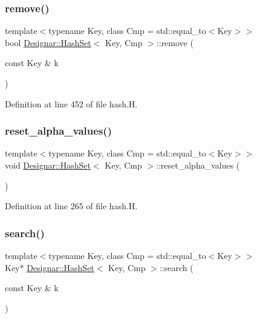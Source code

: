 \subsubsection{\texorpdfstring{remove()}{remove()}}
{\footnotesize\ttfamily template$<$typename Key, class Cmp = std\+::equal\+\_\+to$<$\+Key$>$$>$ \\
bool \hyperlink{class_designar_1_1_hash_set}{Designar\+::\+Hash\+Set}$<$ Key, Cmp $>$\+::remove (\begin{DoxyParamCaption}\item[{const Key \&}]{k }\end{DoxyParamCaption})\hspace{0.3cm}{\ttfamily [inline]}}



Definition at line 452 of file hash.\+H.

\mbox{\label{class_designar_1_1_hash_set_a40fccab92f794f86e2d2fe602f8ffb1f}} 
\subsubsection{\texorpdfstring{reset\+\_\+alpha\+\_\+values()}{reset\_alpha\_values()}}
{\footnotesize\ttfamily template$<$typename Key, class Cmp = std\+::equal\+\_\+to$<$\+Key$>$$>$ \\
void \hyperlink{class_designar_1_1_hash_set}{Designar\+::\+Hash\+Set}$<$ Key, Cmp $>$\+::reset\+\_\+alpha\+\_\+values (\begin{DoxyParamCaption}{ }\end{DoxyParamCaption})\hspace{0.3cm}{\ttfamily [inline]}}



Definition at line 265 of file hash.\+H.

\mbox{\label{class_designar_1_1_hash_set_a4c374f62530fe151b47e42ed05ddc7fb}} 
\subsubsection{\texorpdfstring{search()}{search()}\hspace{0.1cm}{\footnotesize\ttfamily [1/2]}}
{\footnotesize\ttfamily template$<$typename Key, class Cmp = std\+::equal\+\_\+to$<$\+Key$>$$>$ \\
Key$\ast$ \hyperlink{class_designar_1_1_hash_set}{Designar\+::\+Hash\+Set}$<$ Key, Cmp $>$\+::search (\begin{DoxyParamCaption}\item[{const Key \&}]{k }\end{DoxyParamCaption})\hspace{0.3cm}{\ttfamily [inline]}}



